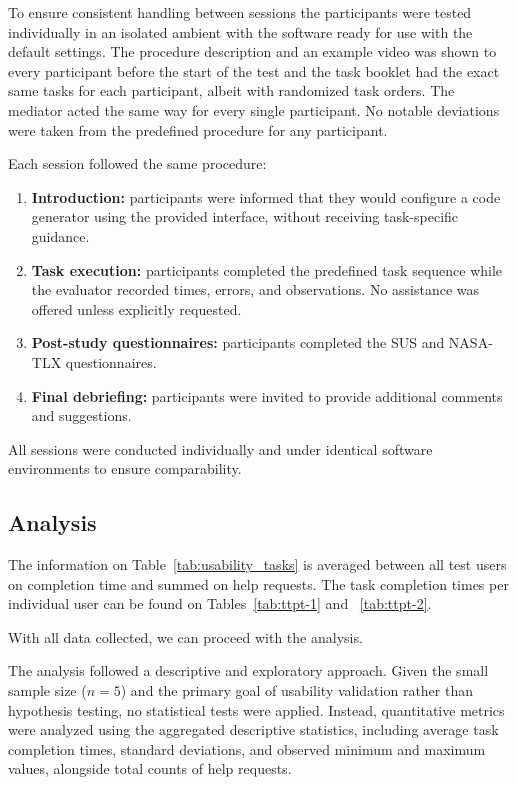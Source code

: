 To ensure consistent handling between sessions the participants were tested individually in an isolated ambient with the software ready for use with the default settings. The procedure description and an example video was shown to every participant before the start of the test and the task booklet had the exact same tasks for each participant, albeit with randomized task orders. The mediator acted the same way for every single participant. No notable deviations were taken from the predefined procedure for any participant.

Each session followed the same procedure:

\begin{enumerate}
	\item \textbf{Introduction:} participants were informed that they would configure a code generator using the provided interface, without receiving task-specific guidance.
	\item \textbf{Task execution:} participants completed the predefined task sequence while the evaluator recorded times, errors, and observations. No assistance was offered unless explicitly requested.
	\item \textbf{Post-study questionnaires:} participants completed the \gls{SUS} and NASA-\gls{TLX} questionnaires.
	\item \textbf{Final debriefing:} participants were invited to provide additional comments and suggestions.
\end{enumerate}

All sessions were conducted individually and under identical software environments to ensure comparability.


\subsection{Analysis}
\label{sec:test_usabl_analysis}


The information on Table~\ref{tab:usability_tasks} is averaged between all test users on completion time and summed on help requests. The task completion times per individual user can be found on Tables~\ref{tab:ttpt-1} and ~\ref{tab:ttpt-2}.

With all data collected, we can proceed with the analysis.

The analysis followed a descriptive and exploratory approach. Given the small sample size ($n=5$) and the primary goal of usability validation rather than hypothesis testing, no statistical tests were applied. Instead, quantitative metrics were analyzed using the aggregated descriptive statistics, including average task completion times, standard deviations, and observed minimum and maximum values, alongside total counts of help requests.

